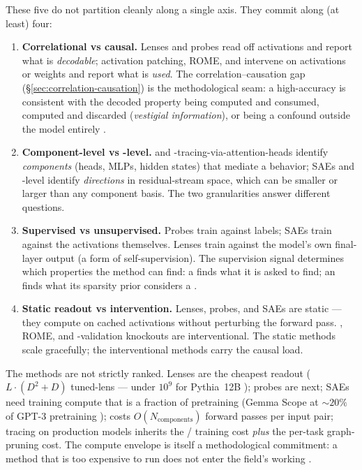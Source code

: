 These five do not partition cleanly along a single axis. They commit
along (at least) four:

\begin{enumerate}
  \item \textbf{Correlational vs causal.} Lenses and probes read off
    activations and report what is \emph{decodable}; activation
    patching, ROME, and  intervene on activations or
    weights and report what is \emph{used}. The correlation--causation
    gap (\S\ref{sec:correlation-causation}) is the
    methodological seam: a high-accuracy  is consistent with the
    decoded property being computed and consumed, computed and
    discarded (\emph{vestigial information}), or being a confound
    outside the model entirely \citep{belinkov2022-probing-survey}.
  \item \textbf{Component-level vs -level.} 
    and -tracing-via-attention-heads identify
    \emph{components} (heads, MLPs, hidden states) that mediate a
    behavior; SAEs and -level  identify
    \emph{directions} in residual-stream space, which can be smaller
    or larger than any component basis. The two granularities answer
    different questions.
  \item \textbf{Supervised vs unsupervised.} Probes train against
    labels; SAEs train against the activations themselves. Lenses
    train against the model's own final-layer output (a form of
    self-supervision). The supervision signal determines which
    properties the method can find: a  finds what it is asked to
    find; an  finds what its sparsity prior considers a .
  \item \textbf{Static readout vs intervention.} Lenses, probes, and
    SAEs are static --- they compute on cached activations without
    perturbing the forward pass. , ROME, and
    -validation knockouts are interventional. The static
    methods scale gracefully; the interventional methods carry the
    causal load.
\end{enumerate}

The methods are not strictly ranked. Lenses are the cheapest readout
($L \cdot (D^2 + D)$ tuned-lens  --- under $10^9$ for
Pythia~12B \citep{belrose2023-tuned-lens}); probes are next; SAEs need
training compute that is a fraction of pretraining (Gemma Scope at $\sim20\%$ of
GPT-3 pretraining \citep{gemma-scope-2024});  costs
$O(N_{\text{components}})$ forward passes per input pair; 
tracing on production models inherits the / training cost
\emph{plus} the per-task graph-pruning cost. The compute envelope is
itself a methodological commitment: a method that is too expensive to
run does not enter the field's working .

